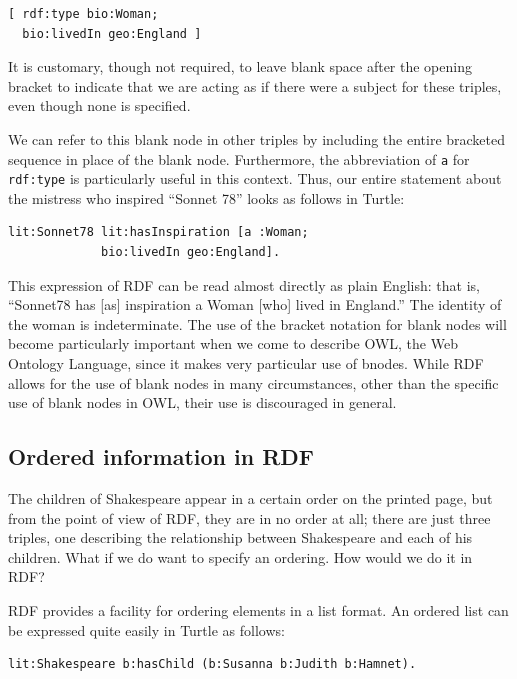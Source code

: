\begin{lstlisting}
[ rdf:type bio:Woman;
  bio:livedIn geo:England ]
\end{lstlisting}

It is customary, though not required, to leave blank space after the
opening bracket to indicate that we are acting as if there were a
subject for these triples, even though none is specified.

We can refer to this blank node in other triples by including the entire
bracketed sequence in place of the blank node. Furthermore, the
abbreviation of \texttt{a} for \texttt{rdf:type} is particularly useful in this
context. Thus, our entire statement about the mistress who inspired
``Sonnet 78'' looks as follows in Turtle:

\begin{lstlisting}
lit:Sonnet78 lit:hasInspiration [a :Woman;
             bio:livedIn geo:England].
\end{lstlisting}

This expression of RDF can be read almost directly as plain English:
that is, ``Sonnet78 has {[}as{]} inspiration a Woman {[}who{]} lived in
England.'' The identity of the woman is indeterminate. The use of the
bracket notation for blank nodes will become particularly important when
we come to describe OWL, the Web Ontology Language, since it makes very
particular use of bnodes. While RDF allows for the use of blank nodes in
many circumstances, other than the specific use of blank nodes in OWL,
their use is discouraged in general.

\subsection{Ordered information in RDF}

The children of Shakespeare appear in a certain order on the printed
page, but from the point of view of RDF, they are in no order at all;
there are just three triples, one describing the relationship between
Shakespeare and each of his children. What if we do want to specify an
ordering. How would we do it in RDF?

RDF provides a facility for ordering elements in a list format. An
ordered list can be expressed quite easily in Turtle as follows:

\begin{lstlisting}
lit:Shakespeare b:hasChild (b:Susanna b:Judith b:Hamnet).
\end{lstlisting}

